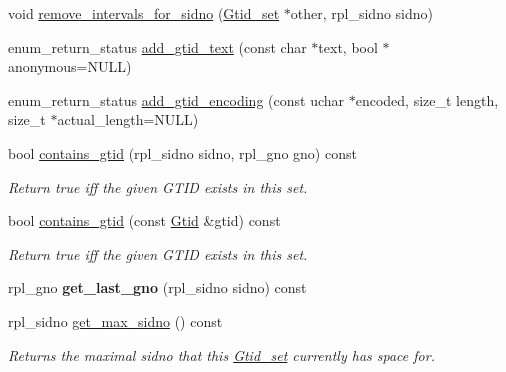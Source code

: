\begin{DoxyCompactItemize}
\item 
void \mbox{\hyperlink{classGtid__set_ac51226ff8e814b700a353fef54763456}{remove\+\_\+intervals\+\_\+for\+\_\+sidno}} (\mbox{\hyperlink{classGtid__set}{Gtid\+\_\+set}} $\ast$other, rpl\+\_\+sidno sidno)
\item 
enum\+\_\+return\+\_\+status \mbox{\hyperlink{classGtid__set_ae854e77cbadfd86cf28b61d5a8e228b9}{add\+\_\+gtid\+\_\+text}} (const char $\ast$text, bool $\ast$anonymous=N\+U\+LL)
\item 
enum\+\_\+return\+\_\+status \mbox{\hyperlink{classGtid__set_ae5f1bc4e5fa45a2902ff562df316cf1b}{add\+\_\+gtid\+\_\+encoding}} (const uchar $\ast$encoded, size\+\_\+t length, size\+\_\+t $\ast$actual\+\_\+length=N\+U\+LL)
\item 
\mbox{\label{classGtid__set_a4e68bd7787bfa962c687120e171eae73}} 
bool \mbox{\hyperlink{classGtid__set_a4e68bd7787bfa962c687120e171eae73}{contains\+\_\+gtid}} (rpl\+\_\+sidno sidno, rpl\+\_\+gno gno) const
\begin{DoxyCompactList}\small\item\em Return true iff the given G\+T\+ID exists in this set. \end{DoxyCompactList}\item 
\mbox{\label{classGtid__set_a5c5f701799a0101c55a594a39969ef20}} 
bool \mbox{\hyperlink{classGtid__set_a5c5f701799a0101c55a594a39969ef20}{contains\+\_\+gtid}} (const \mbox{\hyperlink{structGtid}{Gtid}} \&gtid) const
\begin{DoxyCompactList}\small\item\em Return true iff the given G\+T\+ID exists in this set. \end{DoxyCompactList}\item 
\mbox{\label{classGtid__set_a090363bf019907d9eea5bf9fa6f8719c}} 
rpl\+\_\+gno {\bfseries get\+\_\+last\+\_\+gno} (rpl\+\_\+sidno sidno) const
\item 
\mbox{\label{classGtid__set_afcc3a046cf55b71db3a2def3b4a01ecb}} 
rpl\+\_\+sidno \mbox{\hyperlink{classGtid__set_afcc3a046cf55b71db3a2def3b4a01ecb}{get\+\_\+max\+\_\+sidno}} () const
\begin{DoxyCompactList}\small\item\em Returns the maximal sidno that this \mbox{\hyperlink{classGtid__set}{Gtid\+\_\+set}} currently has space for. \end{DoxyCompactList}\item 

\end{DoxyCompactItemize}
